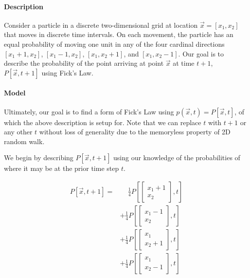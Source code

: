 

\paragraph{Description}
Consider a particle in a discrete two-dimensional grid at location $\vec{x}=[x_1,x_2]$ that moves in discrete time intervals. On each movement, the particle has an equal probability of moving one unit in any of the four cardinal directions $[x_1+1,x_2]$, $[x_1-1,x_2]$, $[x_1,x_2+1]$, and $[x_1,x_2-1]$. Our goal is to describe the probability of the point arriving at point $\vec{x}$ at time $t+1$, $P[\vec{x},t+1]$ using Fick's Law.
    
\paragraph{Model}
Ultimately, our goal is to find a form of Fick's Law using $p(\vec{x},t) = P[\vec{x},t]$, of which the above description is setup for. Note that we can replace $t$ with $t+1$ or any other $t$ without loss of generality due to the memoryless property of 2D random walk.

We begin by describing $P[\vec{x},t+1]$ using our knowledge of the probabilities of where it may be at the prior time step $t$.

\begin{align*}
    P\left[\vec{x}, t+1\right] =&\quad\, \frac{1}{4}P\left[\begin{bmatrix} x_1+1\\x_2 \end{bmatrix}, t\right]\\
    &+\frac{1}{4}P\left[\begin{bmatrix} x_1-1\\x_2 \end{bmatrix}, t\right]\\
    &+\frac{1}{4}P\left[\begin{bmatrix} x_1\\x_2+1 \end{bmatrix}, t\right]\\
    &+\frac{1}{4}P\left[\begin{bmatrix} x_1\\x_2-1 \end{bmatrix}, t\right]
\end{align*}

